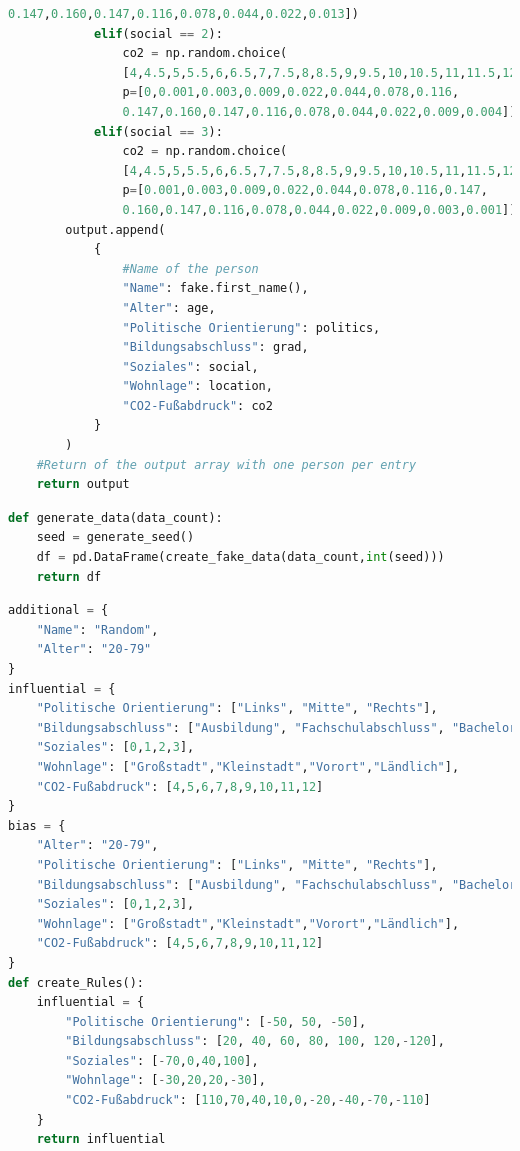\documentclass[a4paper,12pt]{report}
\begin{document}
\begin{lstlisting}[language=Python,label={lst:Sz2Z3},caption=Dritte Zelle für das Generieren der Daten]
                0.147,0.160,0.147,0.116,0.078,0.044,0.022,0.013])
            elif(social == 2):
                co2 = np.random.choice(
                [4,4.5,5,5.5,6,6.5,7,7.5,8,8.5,9,9.5,10,10.5,11,11.5,12], 
                p=[0,0.001,0.003,0.009,0.022,0.044,0.078,0.116,
                0.147,0.160,0.147,0.116,0.078,0.044,0.022,0.009,0.004])
            elif(social == 3):
                co2 = np.random.choice(
                [4,4.5,5,5.5,6,6.5,7,7.5,8,8.5,9,9.5,10,10.5,11,11.5,12], 
                p=[0.001,0.003,0.009,0.022,0.044,0.078,0.116,0.147,
                0.160,0.147,0.116,0.078,0.044,0.022,0.009,0.003,0.001])
        output.append(
            {
                #Name of the person
                "Name": fake.first_name(),
                "Alter": age,
                "Politische Orientierung": politics,
                "Bildungsabschluss": grad,
                "Soziales": social,
                "Wohnlage": location,
                "CO2-Fußabdruck": co2
            }  
        )
    #Return of the output array with one person per entry
    return output
\end{lstlisting}
\begin{lstlisting}[language=Python,label={lst:Sz2Z4},caption=Vierte Zelle Methode zum Generieren der Daten]
def generate_data(data_count):
    seed = generate_seed()
    df = pd.DataFrame(create_fake_data(data_count,int(seed)))
    return df
\end{lstlisting}
\begin{lstlisting}[language=Python,label={lst:Sz2Z5},caption=Fünfte Zelle Methode zum Erstellen der Regeln]
additional = {
    "Name": "Random",
    "Alter": "20-79"
}
influential = {
    "Politische Orientierung": ["Links", "Mitte", "Rechts"],
    "Bildungsabschluss": ["Ausbildung", "Fachschulabschluss", "Bachelor", "Master", "Diplom", "Promotion","ohne"],
    "Soziales": [0,1,2,3],
    "Wohnlage": ["Großstadt","Kleinstadt","Vorort","Ländlich"],
    "CO2-Fußabdruck": [4,5,6,7,8,9,10,11,12]
}
bias = {
    "Alter": "20-79",
    "Politische Orientierung": ["Links", "Mitte", "Rechts"],
    "Bildungsabschluss": ["Ausbildung", "Fachschulabschluss", "Bachelor", "Master", "Diplom", "Promotion","ohne"],
    "Soziales": [0,1,2,3],
    "Wohnlage": ["Großstadt","Kleinstadt","Vorort","Ländlich"],
    "CO2-Fußabdruck": [4,5,6,7,8,9,10,11,12]
}
def create_Rules():
    influential = {
        "Politische Orientierung": [-50, 50, -50],
        "Bildungsabschluss": [20, 40, 60, 80, 100, 120,-120],
        "Soziales": [-70,0,40,100],
        "Wohnlage": [-30,20,20,-30],
        "CO2-Fußabdruck": [110,70,40,10,0,-20,-40,-70,-110]
    }
    return influential
\end{lstlisting}
\end{document}
